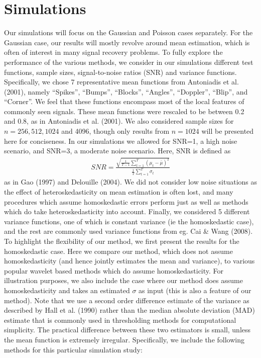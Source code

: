 \documentclass[12pt]{article}
\newcommand{\s}{\sigma}
\begin{document}
\section{Simulations}
Our simulations will focus on the Gaussian and Poisson cases separately. For the Gaussian case, our results will mostly revolve around mean estimation, which is often of interest in many signal recovery problems. To fully explore the performance of the various methods, we consider in our simulations different test functions, sample sizes, signal-to-noise ratios (SNR) and variance functions. Specifically, we chose 7 representative mean functions from Antoniadis et al. (2001), namely ``Spikes'', ``Bumps'', ``Blocks'', ``Angles'', ``Doppler'', ``Blip'', and ``Corner''. We feel that these functions encompass most of the local features of commonly seen signals. These mean functions were rescaled to be between 0.2 and 0.8, as in Antoniadis et al. (2001). We also considered sample sizes for $n=256,512,1024$ and 4096, though only results from $n=1024$ will be presented here for conciseness. In our simulations we allowed for SNR=1, a high noise scenario, and SNR=3, a moderate noise scenario. Here, SNR is defined as
\begin{eqnarray}\label{eq:snr}
SNR=\frac{\sqrt{\frac{1}{T-1}\sum_{t=1}^T(\mu_t-\bar{\mu})^2}}{\frac{1}{T}\sum_{t=1}^T\s_t}
\end{eqnarray}
as in Gao (1997) and Delouille (2004). We did not consider low noise situations as the effect of heteroskedasticity on mean estimation is often lost, and many procedures which assume homoskedastic errors perform just as well as methods which do take heteroskedasticity into account. Finally, we considered 5 different variance functions, one of which is constant variance (ie the homoskedastic case), and the rest are commonly used variance functions from eg. Cai \& Wang (2008).\bigskip\\
To highlight the flexibility of our method, we first present the results for the homoskedastic case. Here we compare our method, which does not assume homoskedasticity (and hence jointly estimates the mean and variance), to various popular wavelet based methods which do assume homoskedasticity. For illustration purposes, we also include the case where our method does assume homoskedasticity and takes an estimated $\s$ as input (this is also a feature of our method). Note that we use a second order difference estimate of the variance as described by Hall et al. (1990) rather than the median absolute deviation (MAD) estimate that is commonly used in thresholding methods for computational simplicity. The practical difference between these two estimators is small, unless the mean function is extremely irregular. Specifically, we include the following methods for this particular simulation study:
\end{document}
